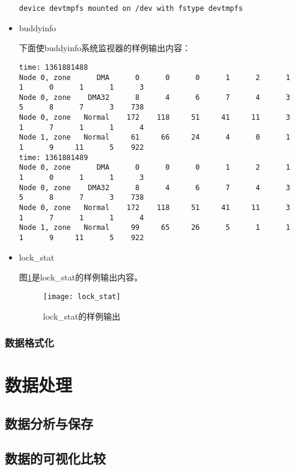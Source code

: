 \begin{itemize}
{\begin{verbatim}
device devtmpfs mounted on /dev with fstype devtmpfs
\end{verbatim}
}
\item buddyinfo

下面使buddyinfo系统监视器的样例输出内容：
{\footnotesize
\begin{verbatim}
time: 1361881488
Node 0, zone      DMA      0      0      0      1      2      1      1      0      1      1      3   
Node 0, zone    DMA32      8      4      6      7      4      3      5      8      7      3    738 
Node 0, zone   Normal    172    118     51     41     11      3      1      7      1      1      4   
Node 1, zone   Normal     61     66     24      4      0      1      1      9     11      5    922 
time: 1361881489
Node 0, zone      DMA      0      0      0      1      2      1      1      0      1      1      3   
Node 0, zone    DMA32      8      4      6      7      4      3      5      8      7      3    738 
Node 0, zone   Normal    172    118     51     41     11      3      1      7      1      1      4   
Node 1, zone   Normal     99     65     26      5      1      1      1      9     11      5    922 
\end{verbatim}
}
\item lock\_stat

图\ref{fig:lock_stat}是lock\_stat的样例输出内容。

\begin{figure}[H]
\centering
\texttt{[image: lock\_stat]}
\caption{lock\_stat的样例输出}
\label{fig:lock_stat}
\end{figure}

\end{itemize}

\subsubsection{数据格式化}

\section{数据处理}

\subsection{数据分析与保存}


\subsection{数据的可视化比较}


